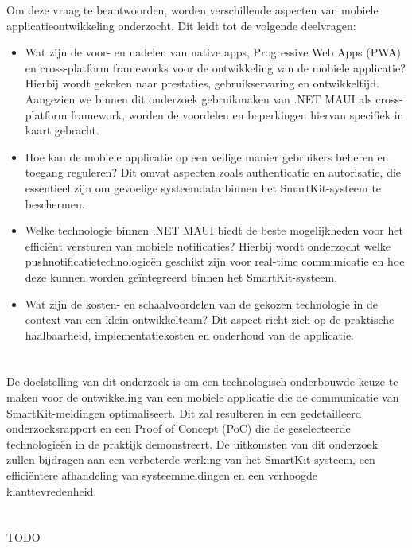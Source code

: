 \noindent Om deze vraag te beantwoorden, worden verschillende aspecten van mobiele applicatieontwikkeling onderzocht. Dit leidt tot de volgende deelvragen:

\begin{itemize} \item Wat zijn de voor- en nadelen van native apps, Progressive Web Apps (PWA) en cross-platform frameworks voor de ontwikkeling van de mobiele applicatie? Hierbij wordt gekeken naar prestaties, gebruikservaring en ontwikkeltijd. Aangezien we binnen dit onderzoek gebruikmaken van .NET MAUI als cross-platform framework, worden de voordelen en beperkingen hiervan specifiek in kaart gebracht.
    \item Hoe kan de mobiele applicatie op een veilige manier gebruikers beheren en toegang reguleren? Dit omvat aspecten zoals authenticatie en autorisatie, die essentieel zijn om gevoelige systeemdata binnen het SmartKit-systeem te beschermen.
    \item Welke technologie binnen .NET MAUI biedt de beste mogelijkheden voor het efficiënt versturen van mobiele notificaties? Hierbij wordt onderzocht welke pushnotificatietechnologieën geschikt zijn voor real-time communicatie en hoe deze kunnen worden geïntegreerd binnen het SmartKit-systeem.
    \item Wat zijn de kosten- en schaalvoordelen van de gekozen technologie in de context van een klein ontwikkelteam? Dit aspect richt zich op de praktische haalbaarheid, implementatiekosten en onderhoud van de applicatie.
\end{itemize}

\section{}%
\label{sec:onderzoeksdoelstelling}

\noindent De doelstelling van dit onderzoek is om een technologisch onderbouwde keuze te maken voor de ontwikkeling van een mobiele applicatie die de communicatie van SmartKit-meldingen optimaliseert. Dit zal resulteren in een gedetailleerd onderzoeksrapport en een Proof of Concept (PoC) die de geselecteerde technologieën in de praktijk demonstreert. De uitkomsten van dit onderzoek zullen bijdragen aan een verbeterde werking van het SmartKit-systeem, een efficiëntere afhandeling van systeemmeldingen en een verhoogde klanttevredenheid. \\

\section{}%
\label{sec:opzet-bachelorproef}

TODO

